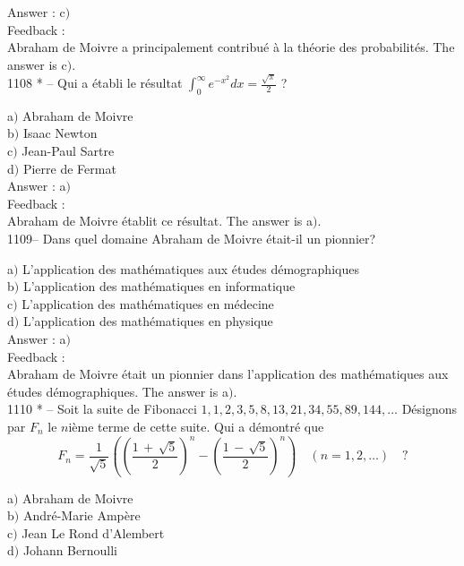 \documentclass[letterpaper, 12pt]{article}
\begin{document}
Answer : c$)$\\

Feedback :\\
Abraham de Moivre a principalement contribu\'e \`a la th\'eorie des
probabilit\'es.
The answer is c$)$.\\

1108 * -- Qui a \'etabli le r\'esultat
$\displaystyle{\int_0^{\infty}e^{-x^2}dx=\frac{\sqrt{\pi}}2}$ ?

a$)$ Abraham de Moivre  \\
b$)$ Isaac Newton \\
c$)$ Jean-Paul Sartre  \\
d$)$ Pierre de Fermat\\

Answer : a$)$\\

Feedback :\\
Abraham de Moivre \'etablit ce r\'esultat.
The answer is a$)$.\\

1109-- Dans quel domaine Abraham de Moivre \'etait-il un pionnier?

a$)$ L'application des math\'ematiques aux \'etudes d\'emographiques  \\
b$)$ L'application des math\'ematiques en informatique \\
c$)$ L'application des math\'ematiques en m\'edecine  \\
d$)$ L'application des math\'ematiques en physique\\

Answer : a$)$\\

Feedback :\\
Abraham de Moivre \'etait un pionnier dans l'application des
math\'ematiques aux \'etudes d\'emographiques.
The answer is a$)$.\\

1110 * -- Soit la suite de Fibonacci
$1,1,2,3,5,8,13,21,34,55,89,144, \ldots$ D\'esignons par $F_n$ le
$n$i\`eme terme de cette suite. Qui a d\'emontr\'e que
$$\displaystyle{F_n=\frac1{\sqrt5}\left(\left(\frac{1\,+\,\sqrt5}2\right)^n-\left(\frac{1\,-\,\sqrt5}2\right)^n\right)\quad(n=1,2,\ldots)}\quad?$$

a$)$ Abraham de Moivre \\
b$)$ Andr\'e-Marie Amp\`ere \\
c$)$ Jean Le Rond d'Alembert  \\
d$)$ Johann Bernoulli\\
\end{document}
